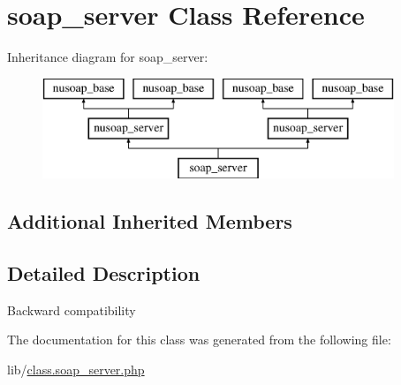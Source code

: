 \hypertarget{classsoap__server}{}\section{soap\+\_\+server Class Reference}
\label{classsoap__server}
Inheritance diagram for soap\+\_\+server\+:\begin{figure}[H]
\begin{center}
\leavevmode
\includegraphics[height=3.000000cm]{classsoap__server}
\end{center}
\end{figure}
\subsection*{Additional Inherited Members}


\subsection{Detailed Description}
Backward compatibility 

The documentation for this class was generated from the following file\+:\begin{DoxyCompactItemize}
\item 
lib/\hyperlink{class_8soap__server_8php}{class.\+soap\+\_\+server.\+php}\end{DoxyCompactItemize}
